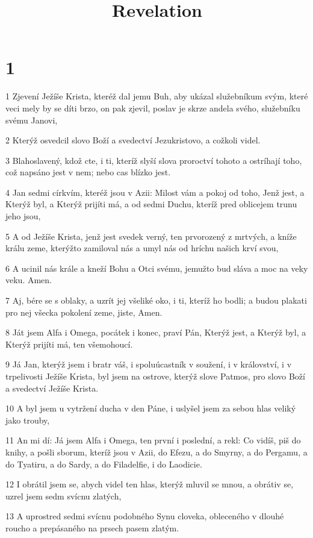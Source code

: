 

\title{Revelation}

\chapter{1}

\par 1 Zjevení Ježíše Krista, kteréž dal jemu Buh, aby ukázal služebníkum svým, které veci mely by se díti brzo, on pak zjevil, poslav je skrze andela svého, služebníku svému Janovi,
\par 2 Kterýž osvedcil slovo Boží a svedectví Jezukristovo, a cožkoli videl.
\par 3 Blahoslavený, kdož cte, i ti, kteríž slyší slova proroctví tohoto a ostríhají toho, což napsáno jest v nem; nebo cas blízko jest.
\par 4 Jan sedmi církvím, kteréž jsou v Azii: Milost vám a pokoj od toho, Jenž jest, a Kterýž byl, a Kterýž prijíti má, a od sedmi Duchu, kteríž pred oblicejem trunu jeho jsou,
\par 5 A od Ježíše Krista, jenž jest svedek verný, ten prvorozený z mrtvých, a kníže králu zeme, kterýžto zamiloval nás a umyl nás od hríchu našich krví svou,
\par 6 A ucinil nás krále a kneží Bohu a Otci svému, jemužto bud sláva a moc na veky veku. Amen.
\par 7 Aj, bére se s oblaky, a uzrít jej všeliké oko, i ti, kteríž ho bodli; a budou plakati pro nej všecka pokolení zeme, jiste, Amen.
\par 8 Ját jsem Alfa i Omega, pocátek i konec, praví Pán, Kterýž jest, a Kterýž byl, a Kterýž prijíti má, ten všemohoucí.
\par 9 Já Jan, kterýž jsem i bratr váš, i spoluúcastník v soužení, i v království, i v trpelivosti Ježíše Krista, byl jsem na ostrove, kterýž slove Patmos, pro slovo Boží a svedectví Ježíše Krista.
\par 10 A byl jsem u vytržení ducha v den Páne, i uslyšel jsem za sebou hlas veliký jako trouby,
\par 11 An mi dí: Já jsem Alfa i Omega, ten první i poslední, a rekl: Co vidíš, piš do knihy, a pošli sborum, kteríž jsou v Azii, do Efezu, a do Smyrny, a do Pergamu, a do Tyatiru, a do Sardy, a do Filadelfie, i do Laodicie.
\par 12 I obrátil jsem se, abych videl ten hlas, kterýž mluvil se mnou, a obrátiv se, uzrel jsem sedm svícnu zlatých,
\par 13 A uprostred sedmi svícnu podobného Synu cloveka, obleceného v dlouhé roucho a prepásaného na prsech pasem zlatým.
